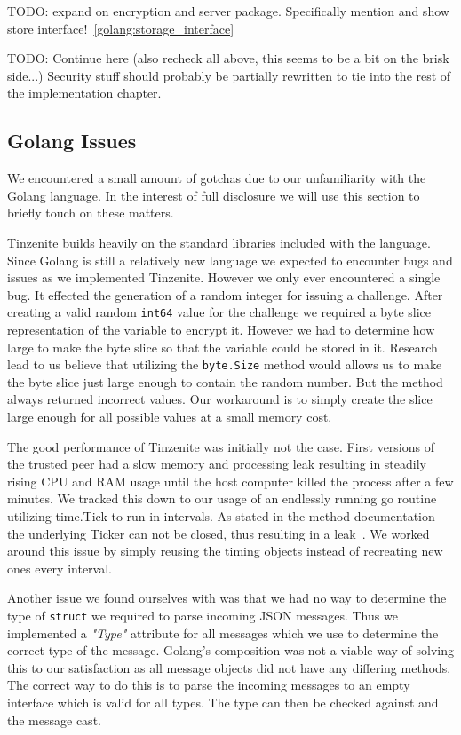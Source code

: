 TODO: expand on encryption and server package.
Specifically mention and show store interface!~\ref{golang:storage_interface}

TODO: Continue here (also recheck all above, this seems to be a bit on the brisk side...)
Security stuff should probably be partially rewritten to tie into the rest of the implementation chapter.

\subsection{Golang Issues}
\label{sub:Golang Issues}

We encountered a small amount of gotchas due to our unfamiliarity with the Golang language.
In the interest of full disclosure we will use this section to briefly touch on these matters.

Tinzenite builds heavily on the standard libraries included with the language.
Since Golang is still a relatively new language we expected to encounter bugs and issues as we implemented Tinzenite.
However we only ever encountered a single bug.
It effected the generation of a random integer for issuing a challenge.
After creating a valid random \texttt{int64} value for the challenge we required a byte slice representation of the variable to encrypt it.
However we had to determine how large to make the byte slice so that the variable could be stored in it.
Research lead to us believe that utilizing the \texttt{byte.Size} method would allows us to make the byte slice just large enough to contain the random number.
But the method always returned incorrect values.
Our workaround is to simply create the slice large enough for all possible values at a small memory cost.

The good performance of Tinzenite was initially not the case.
First versions of the trusted peer had a slow memory and processing leak resulting in steadily rising CPU and RAM usage until the host computer killed the process after a few minutes.
We tracked this down to our usage of an endlessly running go routine utilizing time.Tick to run in intervals.
As stated in the method documentation the underlying Ticker can not be closed, thus resulting in a leak~\cite{web:site:golang:time:tick}.
We worked around this issue by simply reusing the timing objects instead of recreating new ones every interval.

Another issue we found ourselves with was that we had no way to determine the type of \texttt{struct} we required to parse incoming JSON messages.
Thus we implemented a \textit{"Type"} attribute for all messages which we use to determine the correct type of the message.
Golang's composition was not a viable way of solving this to our satisfaction as all message objects did not have any differing methods.
The correct way to do this is to parse the incoming messages to an empty interface which is valid for all types.
The type can then be checked against and the message cast.

